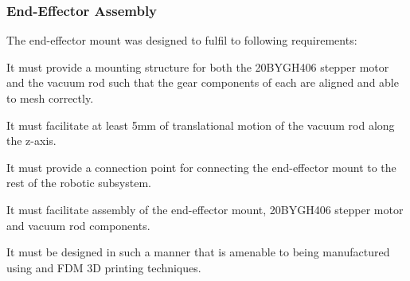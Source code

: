 %
%

\subsubsection{End-Effector Assembly}

The end-effector mount was designed to fulfil to following requirements:

\begin{compactitem}
	\item It must provide a mounting structure for both the 20BYGH406 stepper motor and the vacuum rod such that the gear components of each are aligned and able to mesh correctly.
	\item It must facilitate at least 5mm of translational motion of the vacuum rod along the z-axis.
	\item It must provide a connection point for connecting the end-effector mount to the rest of the robotic subsystem.
	\item It must facilitate assembly of the end-effector mount, 20BYGH406 stepper motor and vacuum rod components.
	\item It must be designed in such a manner that is amenable to being manufactured using and FDM 3D printing techniques. 
\end{compactitem}

